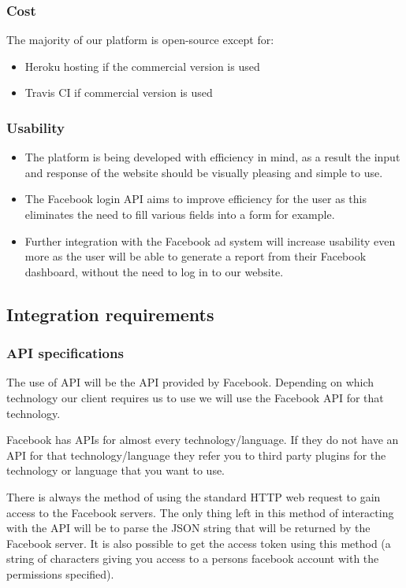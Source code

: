 \documentclass{article}
\begin{document}
		\subsubsection{Cost}
		The majority of our platform is open-source except for:
		\begin{itemize}
			\item Heroku hosting if the commercial version is used
			\item Travis CI if commercial version is used
		\end{itemize}
		\subsubsection{Usability}
		\begin{itemize}
			\item The platform is being developed with efficiency in mind, as a result the input and response of the website should be visually pleasing and simple to use.
			\item The Facebook login API aims to improve efficiency for the user as this eliminates the need to fill various fields into a form for example.
			\item Further integration with the Facebook ad system will increase usability even more as the user will be able to generate a report from their Facebook dashboard, without the need to log in to our website.
		\end{itemize}
		 



	\subsection{Integration requirements}
		\subsubsection{API specifications}
			The use of API will be the API provided by Facebook. Depending on which technology our client requires us to use we will use the Facebook API for that technology.

			Facebook has APIs for almost every technology/language. If they do not have an API for that technology/language they refer you to third party plugins for the technology or language that you want to use.

			There is always the method of using the standard HTTP web request to gain access to the Facebook servers. The only thing left in this method of interacting with the API will be to parse the JSON string that will be returned by the Facebook server. It is also possible to get the access token using this method (a string of characters giving you access to a persons facebook account with the permissions specified).
\end{document}
